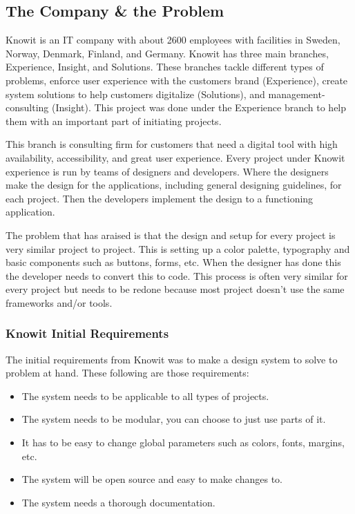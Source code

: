 

\subsection{The Company \& the Problem}
Knowit is an IT company with about 2600 employees with facilities in Sweden, Norway, Denmark, Finland, and Germany. Knowit has three main branches, Experience, Insight, and Solutions. These branches tackle different types of problems, enforce user experience with the customers brand (Experience), create system solutions to help customers digitalize (Solutions), and management-consulting (Insight). This project was done under the Experience branch to help them with an important part of initiating projects.

This branch is consulting firm for customers that need a digital tool with high availability, accessibility, and great user experience. Every project under Knowit experience is run by teams of designers and developers. Where the designers make the design for the applications, including general designing guidelines, for each project. Then the developers implement the design to a functioning application.  

The problem that has araised is that the design and setup for every project is very similar project to project. This is setting up a color palette, typography and basic components such as buttons, forms, etc. When the designer has done this the developer needs to convert this to code. This process is often very similar for every project but needs to be redone because most project doesn't use the same frameworks and/or tools. 

\subsubsection{Knowit Initial Requirements}%
\label{ssub:Knowit Initial Requirements}
The initial requirements from Knowit was to make a design system\cite{fanguyComprehensiveGuideDesign} to solve to problem at hand. These following are those requirements: 
\begin{itemize}
  \item The system needs to be applicable to all types of projects.
  \item The system needs to be modular, you can choose to just use parts of it.
  \item It has to be easy to change global parameters such as colors, fonts, margins, etc.
  \item The system will be open source and easy to make changes to.
  \item The system needs a thorough documentation.
\end{itemize}

